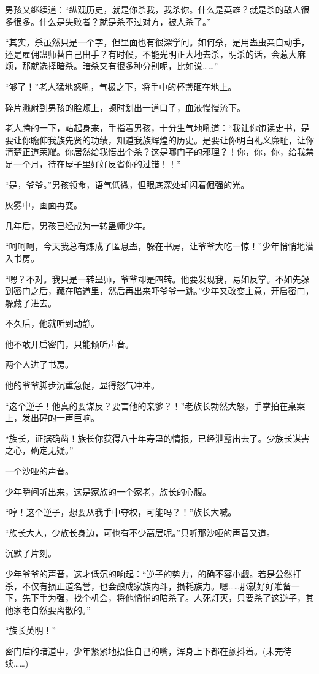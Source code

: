 \begin{this_body}
男孩又继续道：“纵观历史，就是你杀我，我杀你。什么是英雄？就是杀的敌人很多很多。什么是失败者？就是杀不过对方，被人杀了。”

“其实，杀虽然只是一个字，但里面也有很深学问。如何杀，是用蛊虫亲自动手，还是雇佣蛊师替自己出手？有时候，不能光明正大地去杀，明杀的话，会惹大麻烦，那就选择暗杀。暗杀又有很多种分别呢，比如说……”

“够了！”老人猛地怒吼，气极之下，将手中的杯盏砸在地上。

碎片溅射到男孩的脸颊上，顿时划出一道口子，血液慢慢流下。

老人腾的一下，站起身来，手指着男孩，十分生气地吼道：“我让你饱读史书，是要让你瞻仰我族先贤的功绩，知道我族辉煌的历史。是要让你明白礼义廉耻，让你清楚正道荣耀。你居然给我悟出个杀？这是哪门子的邪理？！你，你，你，给我禁足一个月，待在屋子里好好反省你的过错！！”

“是，爷爷。”男孩领命，语气低微，但眼底深处却闪着倔强的光。

灰雾中，画面再变。

几年后，男孩已经成为一转蛊师少年。

“呵呵呵，今天我总有炼成了匿息蛊，躲在书房，让爷爷大吃一惊！”少年悄悄地潜入书房。

“嗯？不对。我只是一转蛊师，爷爷却是四转。他要发现我，易如反掌。不如先躲到密门之后，藏在暗道里，然后再出来吓爷爷一跳。”少年又改变主意，开启密门，躲藏了进去。

不久后，他就听到动静。

他不敢开启密门，只能倾听声音。

两个人进了书房。

他的爷爷脚步沉重急促，显得怒气冲冲。

“这个逆子！他真的要谋反？要害他的亲爹？！”老族长勃然大怒，手掌拍在桌案上，发出砰的一声巨响。

“族长，证据确凿！族长你获得八十年寿蛊的情报，已经泄露出去了。少族长谋害之心，确定无疑。”

一个沙哑的声音。

少年瞬间听出来，这是家族的一个家老，族长的心腹。

“哼！这个逆子，想要从我手中夺权，可能吗？！”族长大喊。

“族长大人，少族长身边，可也有不少高层呢。”只听那沙哑的声音又道。

沉默了片刻。

少年爷爷的声音，这才低沉的响起：“逆子的势力，的确不容小觑。若是公然打杀，不仅有损正道名誉，也会酿成家族内斗，损耗族力。嗯……那就好好准备一下，先下手为强，找个机会，将他悄悄的暗杀了。人死灯灭，只要杀了这逆子，其他家老自然要离散的。”

“族长英明！”

密门后的暗道中，少年紧紧地捂住自己的嘴，浑身上下都在颤抖着。(未完待续……)

\end{this_body}

